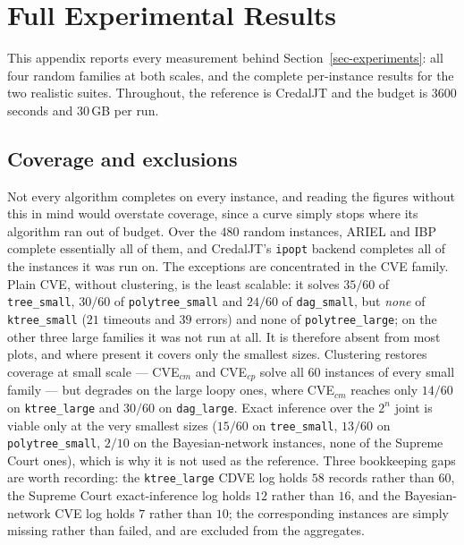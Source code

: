 \documentclass{article}
\begin{document}
\clearpage
\section{Full Experimental Results}
\label{sec-full-results}

This appendix reports every measurement behind Section~\ref{sec-experiments}:
all four random families at both scales, and the complete per-instance results
for the two realistic suites. Throughout, the reference is CredalJT and the
budget is $3600$ seconds and $30$\,GB per run.

\subsection{Coverage and exclusions}
\label{sec-coverage}

Not every algorithm completes on every instance, and reading the figures without
this in mind would overstate coverage, since a curve simply stops where its
algorithm ran out of budget. Over the $480$ random instances, ARIEL and IBP
complete essentially all of them, and CredalJT's \texttt{ipopt} backend completes
all of the instances it was run on. The exceptions are concentrated in the
CVE family. Plain CVE, without clustering, is the least scalable: it solves
$35/60$ of \texttt{tree\_small}, $30/60$ of \texttt{polytree\_small} and $24/60$
of \texttt{dag\_small}, but \emph{none} of \texttt{ktree\_small} ($21$ timeouts
and $39$ errors) and none of \texttt{polytree\_large}; on the other three large
families it was not run at all. It is therefore absent from most plots, and where
present it covers only the smallest sizes. Clustering restores coverage at small
scale --- CVE$_{cm}$ and CVE$_{cp}$ solve all $60$ instances of every small
family --- but degrades on the large loopy ones, where CVE$_{cm}$ reaches only
$14/60$ on \texttt{ktree\_large} and $30/60$ on \texttt{dag\_large}. Exact
inference over the $2^n$ joint is viable only at the very smallest sizes
($15/60$ on \texttt{tree\_small}, $13/60$ on \texttt{polytree\_small}, $2/10$ on
the Bayesian-network instances, none of the Supreme Court ones), which is why it
is not used as the reference. Three bookkeeping gaps are worth recording: the
\texttt{ktree\_large} CDVE log holds $58$ records rather than $60$, the Supreme
Court exact-inference log holds $12$ rather than $16$, and the
Bayesian-network CVE log holds $7$ rather than $10$; the corresponding instances
are simply missing rather than failed, and are excluded from the aggregates.
\end{document}
